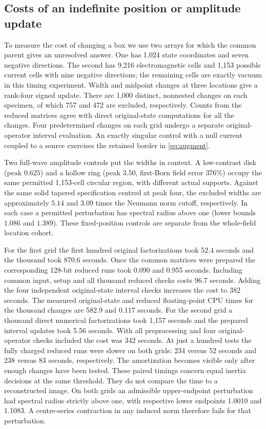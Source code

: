 \subsection{Costs of an indefinite position or amplitude update}
To measure the cost of changing a box we use two arrays for which the common parent gives an unresolved answer. One has 1,024 state coordinates and seven negative directions. The second has 9,216 electromagnetic cells and 1,153 possible current cells with nine negative directions; the remaining cells are exactly vacuum in this timing experiment. Width and midpoint changes at three locations give a rank-four signed update. There are 1,000 distinct, nonnested changes on each specimen, of which 757 and 472 are excluded, respectively. Counts from the reduced matrices agree with direct original-state computations for all the changes. Four predetermined changes on each grid undergo a separate original-operator interval evaluation. An exactly singular control with a null current coupled to a source exercises the retained border in \eqref{eq:augment}.

Two full-wave amplitude controls put the widths in context. A low-contrast disk (peak $0.625$) and a hollow ring (peak $3.50$, first-Born field error $376\%$) occupy the same permitted 1,153-cell circular region, with different actual supports. Against the same solid tapered specification centred at peak four, the excluded widths are approximately $5.14$ and $3.09$ times the Neumann norm cutoff, respectively. In each case a permitted perturbation has spectral radius above one (lower bounds $1.086$ and $1.389$). These fixed-position controls are separate from the whole-field location cohort.

For the first grid the first hundred original factorizations took 52.4 seconds and the thousand took 870.6 seconds. Once the common matrices were prepared the corresponding 128-bit reduced runs took 0.090 and 0.955 seconds. Including common input, setup and all thousand reduced checks costs 96.7 seconds. Adding the four independent original-state interval checks increases the cost to 382 seconds. The measured original-state and reduced floating-point CPU times for the thousand changes are 582.9 and 0.117 seconds. For the second grid a thousand direct numerical factorizations took 1,157 seconds and the prepared interval updates took 5.56 seconds. With all preprocessing and four original-operator checks included the cost was 342 seconds. At just a hundred tests the fully charged reduced runs were slower on both grids: 234 versus 52 seconds and 238 versus 83 seconds, respectively. The amortization becomes visible only after enough changes have been tested. These paired timings concern equal inertia decisions at the same threshold. They do not compare the time to a reconstructed image. On both grids an admissible upper-endpoint perturbation had spectral radius strictly above one, with respective lower endpoints 1.0010 and 1.1083. A centre-series contraction in any induced norm therefore fails for that perturbation.

